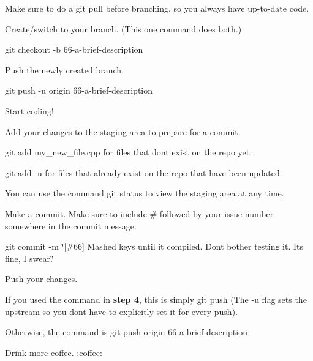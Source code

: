 Make sure to do a {\ttfamily git pull} before branching, so you always have up-\/to-\/date code.
\begin{DoxyEnumerate}
\item Create/switch to your branch. (This one command does both.)
\begin{DoxyItemize}
\item {\ttfamily git checkout -\/b 66-\/a-\/brief-\/description}
\end{DoxyItemize}
\item Push the newly created branch.
\begin{DoxyItemize}
\item {\ttfamily git push -\/u origin 66-\/a-\/brief-\/description}
\end{DoxyItemize}
\item Start coding!
\item Add your changes to the staging area to prepare for a commit.
\begin{DoxyItemize}
\item {\ttfamily git add my\+\_\+new\+\_\+file.\+cpp} for files that don\textquotesingle{}t exist on the repo yet.
\item {\ttfamily git add -\/u} for files that already exist on the repo that have been updated.
\item You can use the command {\ttfamily git status} to view the staging area at any time.
\end{DoxyItemize}
\item Make a commit. Make sure to include \textquotesingle{}\#\textquotesingle{} followed by your issue number somewhere in the commit message.
\begin{DoxyItemize}
\item {\ttfamily git commit -\/m \char`\"{}\mbox{[}\#66\mbox{]} Mashed keys until it compiled. Don\textquotesingle{}t bother testing it. It\textquotesingle{}s fine, I swear.\char`\"{}}
\end{DoxyItemize}
\item Push your changes.
\begin{DoxyItemize}
\item If you used the command in {\bfseries step 4}, this is simply {\ttfamily git push} (The {\ttfamily -\/u} flag sets the upstream so you don\textquotesingle{}t have to explicitly set it for every push).
\item Otherwise, the command is {\ttfamily git push origin 66-\/a-\/brief-\/description}
\end{DoxyItemize}
\item Drink more coffee. \+:coffee\+:
\end{DoxyEnumerate}


